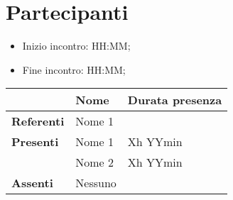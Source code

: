 \section{Partecipanti}

\begin{itemize}
    \item Inizio incontro: HH:MM;
    \item Fine incontro: HH:MM;
\end{itemize}


\begin{center}
{\renewcommand{\arraystretch}{1.5}
\begin{tabular}{l|ll}
	                    & \textbf{Nome} & \textbf{Durata presenza} 	\\
	\hline
	\textbf{Referenti} 	& Nome 1 		&			\\
	\hline
	\textbf{Presenti}   & Nome 1		& Xh YYmin  \\  
						& Nome 2		& Xh YYmin  \\  
	\hline
	\textbf{Assenti}	& Nessuno		&			\\
\end{tabular}	
}
\end{center}